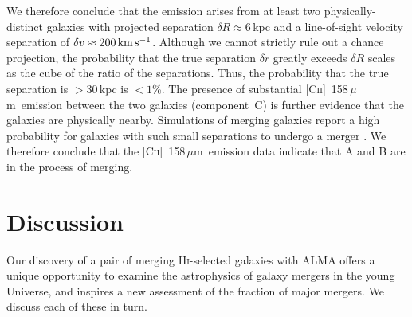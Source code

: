 \documentclass[twocolumn]{aastex62}
\newcommand{\cplus}{[\ctwo]~158\,$\mu$m}
\newcommand{\mrperp}{R}
\newcommand{\rsep}{6}  %
\newcommand{\mkms}{\rm km \, s^{-1}}
\newcommand{\hi}{H\textsc{i}}
\newcommand{\ctwo}{C\textsc{ii}}
\begin{document}
We therefore conclude that the emission arises from at least two 
physically-distinct galaxies with projected separation $\delta \mrperp \approx \rsep$\,kpc 
and a line-of-sight velocity separation of $\delta v \approx 200 \, \mkms$. Although we cannot 
strictly rule out a chance projection, the probability that the true separation $\delta r$ 
greatly exceeds $\delta \mrperp$ scales as the cube of the ratio of the separations. Thus, 
the probability that the true separation is $> 30$\,kpc is $< 1$\%. The presence of substantial 
\cplus\ emission between the two galaxies (component~C) is further evidence that the galaxies 
are physically nearby. Simulations of merging galaxies report a high probability for galaxies 
with such small separations to undergo a merger \citep[e.g.][]{patton+00}. We therefore 
conclude that the \cplus\ emission data indicate that A and B are in the process of merging.

\section{Discussion}
\label{sec:discuss}

Our discovery of a pair of merging \hi-selected galaxies with ALMA offers a unique opportunity to 
examine the astrophysics of galaxy mergers in the young Universe, and inspires a new assessment 
of the fraction of major mergers. We discuss each of these in turn.
\end{document}
